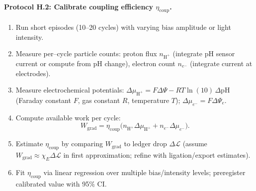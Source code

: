 \documentclass[11pt]{article}
\begin{document}
\paragraph{Protocol H.2: Calibrate coupling efficiency $\eta_{\mathrm{coup}}$.}
\begin{enumerate}
\item Run short episodes (10–20 cycles) with varying bias amplitude or light intensity.
\item Measure per–cycle particle counts: proton flux $n_{\mathrm{H}^+}$ (integrate pH sensor current or compute from pH change), electron count $n_{e^-}$ (integrate current at electrodes).
\item Measure electrochemical potentials: $\Delta\mu_{\mathrm{H}^+}=F\Delta\Psi-RT\ln(10)\,\Delta\mathrm{pH}$ (Faraday constant $F$, gas constant $R$, temperature $T$); $\Delta\mu_{e^-}=F\Delta\Psi_e$.
\item Compute available work per cycle:
\[
W_{\mathrm{grad}}=\eta_{\mathrm{coup}}\big(n_{\mathrm{H}^+}\Delta\mu_{\mathrm{H}^+}+n_{e^-}\Delta\mu_{e^-}\big).
\]
\item Estimate $\eta_{\mathrm{coup}}$ by comparing $W_{\mathrm{grad}}$ to ledger drop $\Delta\mathcal{L}$ (assume $W_{\mathrm{grad}}\approx \chi_E\Delta\mathcal{L}$ in first approximation; refine with ligation/export estimates).
\item Fit $\eta_{\mathrm{coup}}$ via linear regression over multiple bias/intensity levels; preregister calibrated value with 95\% CI.
\end{enumerate}
\end{document}
